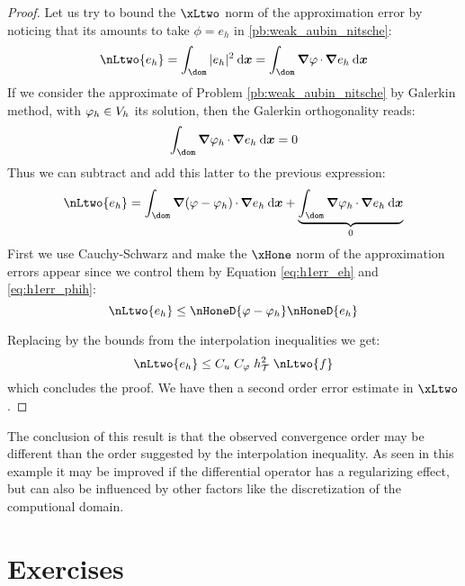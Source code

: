 \begin{proof}
\medskip
Let us try to bound the $\xLtwo$ norm of the approximation error by noticing that its amounts to take $\phi = e_h$ in \eqref{pb:weak_aubin_nitsche}:
\begin{equation*}
\nLtwo{e_h} = \int_\dom |e_h|^2 \dx = \int_\dom \Grad \varphi\xDot \Grad e_h\dx
\end{equation*}
If we consider the approximate of Problem \eqref{pb:weak_aubin_nitsche} by Galerkin method, with $\varphi_h \in {{V}}_h$ its solution, then the Galerkin orthogonality reads:
\begin{equation*}
\int_\dom \Grad \varphi_h\xDot \Grad e_h\dx  = 0
\end{equation*}
Thus we can subtract and add this latter to the previous expression:
\begin{equation*}
\nLtwo{e_h} = \int_\dom \Grad (\varphi - \varphi_h)\xDot \Grad e_h\dx + \underbrace{\int_\dom \Grad \varphi_h\xDot \Grad e_h\dx}_{0}
\end{equation*}
First we use Cauchy-Schwarz and make the $\xHone$ norm of the approximation errors appear since we control them by Equation \eqref{eq:h1err_eh} and \eqref{eq:h1err_phih}:
\begin{equation*}
\nLtwo{e_h} \leq \nHoneD{\varphi - \varphi_h} \nHoneD{e_h}
\end{equation*}

\medskip
Replacing by the bounds from the interpolation inequalities we get:
\begin{equation*}
\nLtwo{e_h} \leq C_u\;C_\varphi\;\sizeT^2\;\nLtwo{f}
\end{equation*}
which concludes the proof. We have then a second order error estimate in $\xLtwo$.
\end{proof}

The conclusion of this result is that the observed convergence order may be different than the order suggested by the interpolation inequality.
As seen in this example it may be improved if the differential operator has a regularizing effect, but can also be influenced by other factors like the discretization of the computional domain.

\newpage
\section{Exercises}


